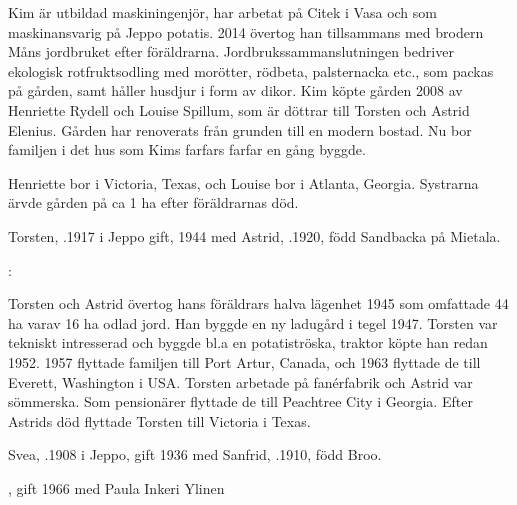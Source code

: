 Kim är utbildad maskiningenjör, har arbetat på Citek i Vasa och som maskinansvarig på Jeppo potatis. 2014 övertog han tillsammans med brodern Måns jordbruket efter föräldrarna. Jordbrukssammanslutningen bedriver ekologisk rotfruktsodling med morötter, rödbeta, palsternacka etc., som packas på gården, samt håller husdjur i form av dikor. Kim köpte gården 2008 av Henriette Rydell och Louise Spillum, som är döttrar till Torsten och Astrid Elenius. Gården har renoverats från grunden till en modern bostad. Nu bor familjen i det hus som Kims farfars farfar en gång byggde.


%
Henriette bor i Victoria, Texas, och Louise bor i Atlanta, Georgia. Systrarna ärvde gården på ca 1 ha efter föräldrarnas död.\jhvspace{}



%
Torsten, .1917 i Jeppo gift, 1944 med Astrid, .1920, född Sandbacka på Mietala.
\begin{jhchildren}
  \item {}
  \item {}
\end{jhchildren}
:

Torsten och Astrid övertog hans föräldrars halva lägenhet 1945 som 	omfattade 44 ha varav 16 ha odlad jord. Han byggde en ny ladugård i tegel 1947. Torsten var tekniskt intresserad och byggde bl.a en potatiströska, traktor köpte han redan 1952. 1957 flyttade familjen till Port Artur, Canada, och 1963 flyttade de till Everett, Washington i USA. Torsten arbetade på fanérfabrik och Astrid var sömmerska. Som pensionärer flyttade de till Peachtree City i Georgia. Efter Astrids död flyttade Torsten till Victoria i Texas.


%
Svea, .1908 i Jeppo, gift 1936 med Sanfrid, .1910, född Broo.
\begin{jhchildren}
  \item {}
  \item {}
  \item {}, gift 1966 med Paula Inkeri Ylinen
\end{jhchildren}

